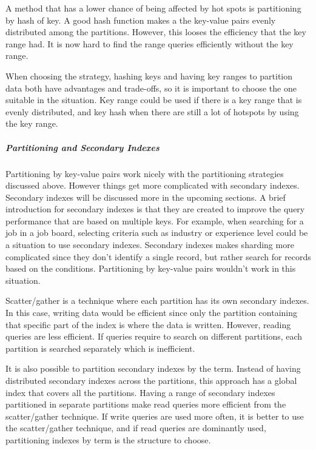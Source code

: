 A method that has a lower chance of being affected by hot spots is partitioning by hash of key. A good hash function makes a the key-value pairs evenly distributed among the partitions. However, this looses the efficiency that the key range had. It is now hard to find the range queries efficiently without the key range. 

When choosing the strategy, hashing keys and having key ranges to partition data both have advantages and trade-offs, so it is important to choose the one suitable in the situation. Key range could be used if there is a key range that is evenly distributed, and key hash when there are still a lot of hotspots by using the key range. 

\subparagraph{Partitioning and Secondary Indexes}
Partitioning by key-value pairs work nicely with the partitioning strategies discussed above. However things get more complicated with secondary indexes. Secondary indexes will be discussed more in the upcoming sections. A brief introduction for secondary indexes is that they are created to improve the query performance that are based on multiple keys. For example, when searching for a job in a job board, selecting criteria such as industry or experience level could be a situation to use secondary indexes. Secondary indexes makes sharding more complicated since they don’t identify a single record, but rather search for records based on the conditions. Partitioning by key-value pairs wouldn’t work in this situation.

Scatter/gather is a technique where each partition has its own secondary indexes. In this case, writing data would be efficient since only the partition containing that specific part of the index is where the data is written. However, reading queries are less efficient.  If queries require to search on different partitions, each partition is searched separately which is inefficient. 

It is also possible to partition secondary indexes by the term. Instead of having distributed secondary indexes across the partitions, this approach has a global index that covers all the partitions. Having a range of secondary indexes partitioned in separate partitions make read queries more efficient from the scatter/gather technique. If write queries are used more often, it is better to use the scatter/gather technique, and if read queries are dominantly used, partitioning indexes by term is the structure to choose. 

